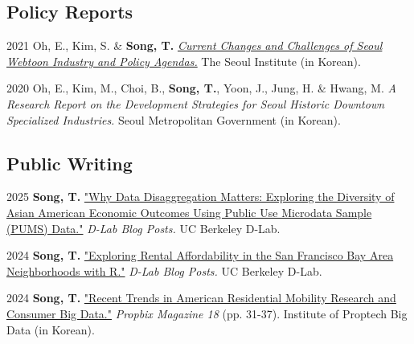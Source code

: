 \documentclass[11pt,letterpaper]{report}
\begin{document}
\subsection*{Policy Reports}
\begin{tablist}
\item[2021] \tab{}Oh, E., Kim, S. \& \textbf{Song, T.} \emph{\href{https://www.si.re.kr/bbs/view.do?key=2024100039&pstSn=2111190001}{Current Changes and Challenges of Seoul Webtoon Industry and Policy Agendas.}} The Seoul Institute (in Korean).
\item[2020] \tab{}Oh, E., Kim, M., Choi, B., \textbf{Song, T.}, Yoon, J., Jung, H. \& Hwang, M. \emph{A Research Report on the Development Strategies for Seoul Historic Downtown Specialized Industries.} Seoul Metropolitan Government (in Korean).
\end{tablist}
\subsection*{Public Writing}
\begin{tablist}
\item[2025] \tab{}\textbf{Song, T.} \href{https://medium.com/@dlab-berkeley/why-data-disaggregation-matters-exploring-the-diversity-of-asian-american-economic-outcomes-using-8b96e5dcc9a4}{"Why Data Disaggregation Matters: Exploring the Diversity of Asian American Economic Outcomes Using Public Use Microdata Sample (PUMS) Data."} \emph{D-Lab Blog Posts.} UC Berkeley D-Lab.
\item[2024] \tab{}\textbf{Song, T.} \href{https://medium.com/@dlab-berkeley/exploring-rental-affordability-in-the-san-francisco-bay-area-neighborhoods-with-r-c4383f7553e7}{"Exploring Rental Affordability in the San Francisco Bay Area Neighborhoods with R."} \emph{D-Lab Blog Posts.} UC Berkeley D-Lab.
\item[2024] \tab{}\textbf{Song, T.} \href{https://www.kahps.org/data/prbx/pdf_44_7}{"Recent Trends in American Residential Mobility Research and Consumer Big Data."} \emph{Propbix Magazine 18} (pp. 31-37). Institute of Proptech Big Data (in Korean).
\end{tablist}
\end{document}
